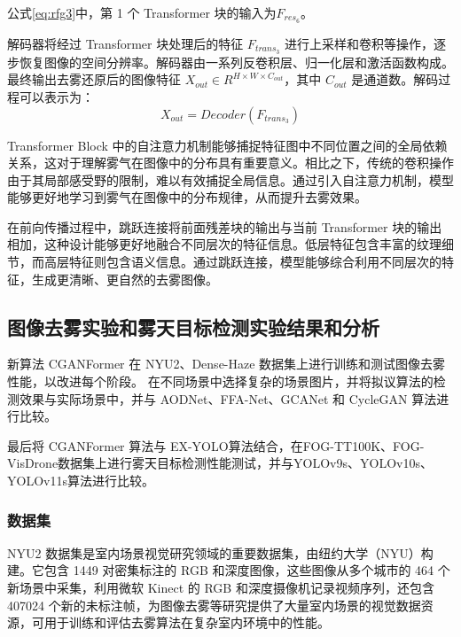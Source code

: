 公式\ref{eq:rfg3}中，第 1 个 Transformer 块的输入为$F_{res_6}$。

解码器将经过 Transformer 块处理后的特征 $F_{trans_3}$ 进行上采样和卷积等操作，逐步恢复图像的空间分辨率。解码器由一系列反卷积层、归一化层和激活函数构成。最终输出去雾还原后的图像特征 $X_{out} \in R^{H \times W \times C_{out}}$，其中 $C_{out}$ 是通道数。解码过程可以表示为：
\begin{equation}
    \label{eq:rfg4}
    X_{out} = Decoder(F_{trans_3})
\end{equation}


Transformer Block 中的自注意力机制能够捕捉特征图中不同位置之间的全局依赖关系，这对于理解雾气在图像中的分布具有重要意义。相比之下，传统的卷积操作由于其局部感受野的限制，难以有效捕捉全局信息。通过引入自注意力机制，模型能够更好地学习到雾气在图像中的分布规律，从而提升去雾效果。

在前向传播过程中，跳跃连接将前面残差块的输出与当前 Transformer 块的输出相加，这种设计能够更好地融合不同层次的特征信息。低层特征包含丰富的纹理细节，而高层特征则包含语义信息。通过跳跃连接，模型能够综合利用不同层次的特征，生成更清晰、更自然的去雾图像。

\subsection{图像去雾实验和雾天目标检测实验结果和分析}

新算法 CGANFormer 在 NYU2\cite{nyu2}、Dense-Haze\cite{NTIRE_Dehazing_2019} 数据集上进行训练和测试图像去雾性能，以改进每个阶段。
在不同场景中选择复杂的场景图片，并将拟议算法的检测效果与实际场景中，并与 AODNet\cite{li2017aod}、FFA-Net\cite{ffa}、GCANet\cite{chen2019gated} 和 CycleGAN\cite{cgan} 算法进行比较。

最后将 CGANFormer 算法与 EX-YOLO算法结合，在FOG-TT100K、FOG-VisDrone数据集上进行雾天目标检测性能测试，并与YOLOv9s\cite{yolov9}、YOLOv10s\cite{yolov10}、YOLOv11s\cite{yolov11}算法进行比较。

\subsubsection{数据集}

NYU2 数据集是室内场景视觉研究领域的重要数据集，由纽约大学（NYU）构建。它包含 1449 对密集标注的 RGB 和深度图像，这些图像从多个城市的 464 个新场景中采集，利用微软 Kinect 的 RGB 和深度摄像机记录视频序列，还包含 407024 个新的未标注帧，为图像去雾等研究提供了大量室内场景的视觉数据资源，可用于训练和评估去雾算法在复杂室内环境中的性能。

